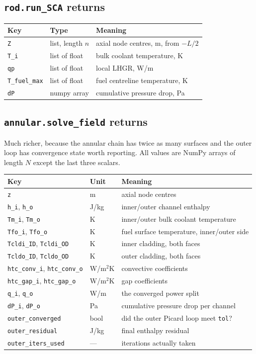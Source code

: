 \documentclass[11pt]{article}
\newcommand{\code}[1]{\texttt{#1}}
\begin{document}
\subsection{\code{rod.run\_SCA} returns}
\begin{center}
\begin{tabular}{llp{6.2cm}}
\toprule
Key & Type & Meaning \\
\midrule
\code{Z}          & list, length $n$ & axial node centres, m, from $-L/2$ \\
\code{T\_i}       & list of float & bulk coolant temperature, K \\
\code{qp}         & list of float & local LHGR, W/m \\
\code{T\_fuel\_max} & list of float & fuel centreline temperature, K \\
\code{dP}         & numpy array & cumulative pressure drop, Pa \\
\bottomrule
\end{tabular}
\end{center}

\subsection{\code{annular.solve\_field} returns}
Much richer, because the annular chain has twice as many surfaces and the outer loop has
convergence state worth reporting. All values are NumPy arrays of length $N$ except the
last three scalars.

\begin{center}
\begin{tabular}{llp{6.0cm}}
\toprule
Key & Unit & Meaning \\
\midrule
\code{z} & m & axial node centres \\
\code{h\_i}, \code{h\_o} & J/kg & inner/outer channel enthalpy \\
\code{Tm\_i}, \code{Tm\_o} & K & inner/outer bulk coolant temperature \\
\code{Tfo\_i}, \code{Tfo\_o} & K & fuel surface temperature, inner/outer side \\
\code{Tcldi\_ID}, \code{Tcldi\_OD} & K & inner cladding, both faces \\
\code{Tcldo\_ID}, \code{Tcldo\_OD} & K & outer cladding, both faces \\
\code{htc\_conv\_i}, \code{htc\_conv\_o} & W/m$^2$K & convective coefficients \\
\code{htc\_gap\_i}, \code{htc\_gap\_o} & W/m$^2$K & gap coefficients \\
\code{q\_i}, \code{q\_o} & W/m & the converged power split \\
\code{dP\_i}, \code{dP\_o} & Pa & cumulative pressure drop per channel \\
\code{outer\_converged} & bool & did the outer Picard loop meet \code{tol}? \\
\code{outer\_residual} & J/kg & final enthalpy residual \\
\code{outer\_iters\_used} & --- & iterations actually taken \\
\bottomrule
\end{tabular}
\end{center}
\end{document}
